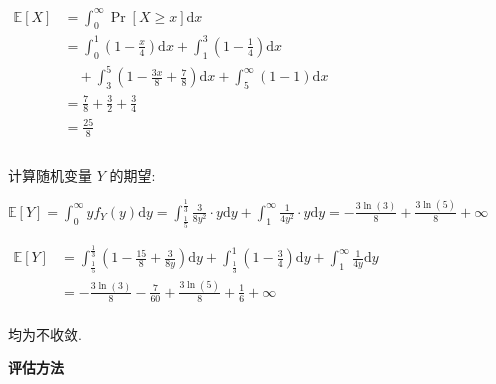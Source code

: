 \documentclass[answers]{exam}  %
\begin{document}
\begin{questions}
\begin{solution}
\begin{enumerate}
            $
              \begin{aligned}
                \mathbb{E}[X] & = \int_{0}^{\infty} \operatorname{Pr}[X \ge x] \mathrm{d}x                                                \\
                              & = \int_{0}^{1} (1 - \frac{x}{4}) \mathrm{d}x + \int_{1}^{3} (1 - \frac{1}{4}) \mathrm{d}x                 \\
                              & \quad + \int_{3}^{5} (1 - \frac{3x}{8} + \frac{7}{8}) \mathrm{d}x + \int_{5}^{\infty} (1 - 1) \mathrm{d}x \\
                              & = \frac{7}{8} + \frac{3}{2} + \frac{3}{4}                                                                 \\
                              & = \frac{25}{8}                                                                                            \\
                \\
              \end{aligned}
            $

            计算随机变量 $Y$ 的期望:

            $\displaystyle \mathbb{E}[Y] = \int_{0}^{\infty} yf_{Y}(y) \mathrm{d}y = \int_{\frac{1}{5}}^{\frac{1}{3}} \frac{3}{8y^{2}} \cdot y \mathrm{d}y + \int_{1}^{\infty} \frac{1}{4y^{2}} \cdot y \mathrm{d}y = - \frac{3 \ln{\left(3 \right)}}{8} + \frac{3 \ln{\left(5 \right)}}{8} + \infty$

            $
              \begin{aligned}
                \mathbb{E}[Y] & = \int_{\frac{1}{5}}^{\frac{1}{3}} (1 - \frac{15}{8} + \frac{3}{8y}) \mathrm{d}y + \int_{\frac{1}{3}}^{1} (1 - \frac{3}{4}) \mathrm{d}y + \int_{1}^{\infty} \frac{1}{4y} \mathrm{d}y \\
                              & = - \frac{3 \ln{\left(3 \right)}}{8} - \frac{7}{60} + \frac{3 \ln{\left(5 \right)}}{8} + \frac{1}{6} + \infty                                                                        \\
              \end{aligned}
            $

            均为不收敛.
    \end{enumerate}
  \end{solution}


  \question [40] \textbf{评估方法}


\end{questions}
\end{document}
